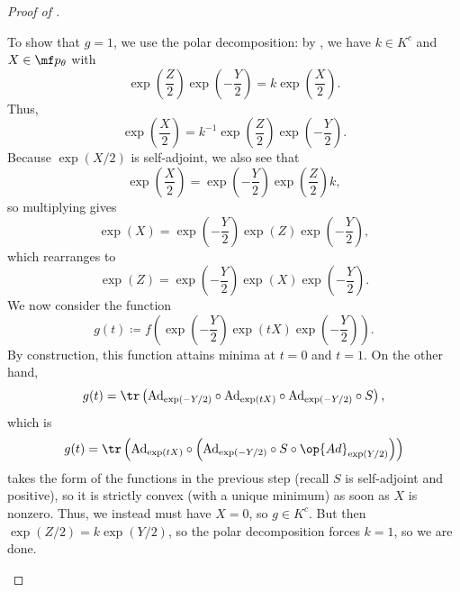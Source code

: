 \documentclass[../notes.tex]{subfiles}
\begin{document}
\begin{proof}[Proof of ]
\begin{enumerate}
		To show that $g=1$, we use the polar decomposition: by , we have $k\in K^c$ and $X\in\mf p_\theta$ with
		\[\exp\left(\frac Z2\right)\exp\left(-\frac Y2\right)=k\exp\left(\frac X2\right).\]
		Thus,
		\[\exp\left(\frac X2\right)=k^{-1}\exp\left(\frac Z2\right)\exp\left(-\frac Y2\right).\]
		Because $\exp(X/2)$ is self-adjoint, we also see that
		\[\exp\left(\frac X2\right)=\exp\left(-\frac Y2\right)\exp\left(\frac Z2\right)k,\]
		so multiplying gives
		\[\exp(X)=\exp\left(-\frac Y2\right)\exp(Z)\exp\left(-\frac Y2\right),\]
		which rearranges to
		\[\exp(Z)=\exp\left(-\frac Y2\right)\exp(X)\exp\left(-\frac Y2\right).\]
		We now consider the function
		\[g(t)\coloneqq f\left(\exp\left(-\frac Y2\right)\exp(tX)\exp\left(-\frac Y2\right)\right).\]
		By construction, this function attains minima at $t=0$ and $t=1$. On the other hand,
		\[g(t)=\tr\left(\mathrm{Ad}_{\exp(-Y/2)}\circ\mathrm{Ad}_{\exp(tX)}\circ\mathrm{Ad}_{\exp(-Y/2)}\circ S\right),\]
		which is
		\[g(t)=\tr\left(\mathrm{Ad}_{\exp(tX)}\circ\left(\mathrm{Ad}_{\exp(-Y/2)}\circ S\circ\op{Ad}_{\exp(Y/2)}\right)\right)\]
		takes the form of the functions in the previous step (recall $S$ is self-adjoint and positive), so it is strictly convex (with a unique minimum) as soon as $X$ is nonzero. Thus, we instead must have $X=0$, so $g\in K^c$. But then $\exp(Z/2)=k\exp(Y/2)$, so the polar decomposition forces $k=1$, so we are done.
		\qedhere
	\end{enumerate}
\end{proof}
\end{document}

